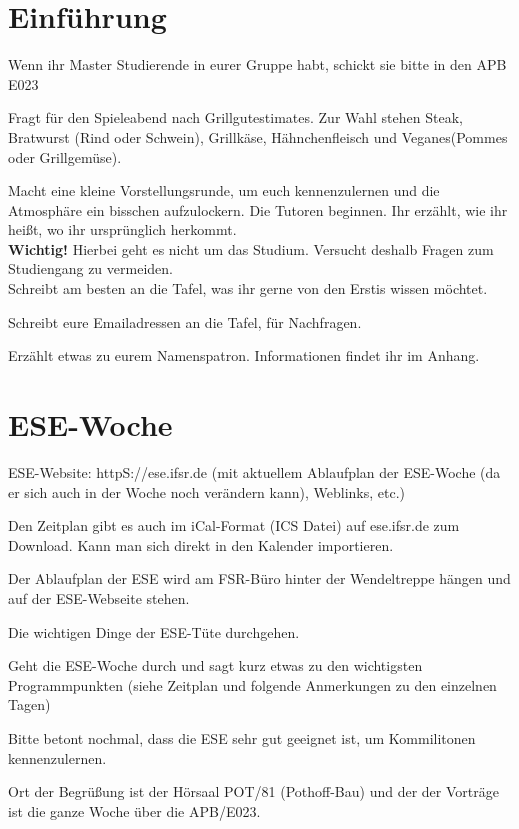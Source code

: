 \documentclass[a4paper,12pt]{report}
\begin{document}
\section{Einführung}
\begin{itemize*}
\item Wenn ihr Master Studierende in eurer Gruppe habt, schickt sie bitte in den APB E023
\item Fragt für den Spieleabend nach Grillgutestimates. Zur Wahl stehen Steak, Bratwurst (Rind oder Schwein), Grillkäse, Hähnchenfleisch und Veganes(Pommes oder Grillgemüse).
\item Macht eine kleine Vorstellungsrunde, um euch kennenzulernen und die Atmosphäre ein bisschen aufzulockern.
Die Tutoren beginnen. Ihr erzählt, wie ihr heißt, wo ihr ursprünglich herkommt.\\
\textbf{Wichtig!} Hierbei geht es nicht um das Studium. Versucht deshalb Fragen zum Studiengang zu vermeiden.\\
Schreibt am besten an die Tafel, was ihr gerne von den Erstis wissen möchtet.
\item Schreibt eure Emailadressen an die Tafel, für Nachfragen.
\item Erzählt etwas zu eurem Namenspatron. Informationen findet ihr im Anhang.
\end{itemize*}

\section{ESE-Woche}
\begin{itemize*}
\item ESE-Website: httpS://ese.ifsr.de (mit aktuellem Ablaufplan der ESE-Woche (da er sich auch in der Woche noch verändern kann), Weblinks, etc.)
\item Den Zeitplan gibt es auch im iCal-Format (ICS Datei) auf ese.ifsr.de zum Download.
Kann man sich direkt in den Kalender importieren.
\item Der Ablaufplan der ESE wird am FSR-Büro hinter der Wendeltreppe hängen und auf der ESE-Webseite stehen.
\item Die wichtigen Dinge der ESE-Tüte durchgehen.
\item Geht die ESE-Woche durch und sagt kurz etwas zu den wichtigsten Programmpunkten (siehe Zeitplan und folgende Anmerkungen zu den einzelnen Tagen)
\item Bitte betont nochmal, dass die ESE sehr gut geeignet ist, um Kommilitonen kennenzulernen.
\end{itemize*}
Ort der Begrüßung ist der Hörsaal POT/81 (Pothoff-Bau) und der der Vorträge ist die ganze Woche über die APB/E023.
\end{document}
